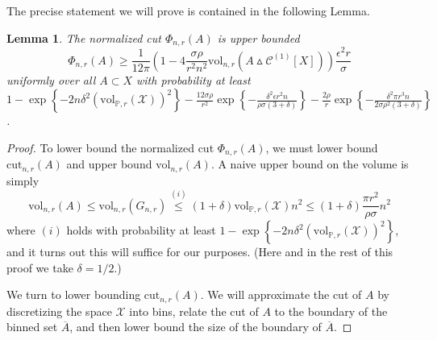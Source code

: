 \documentclass[11pt,twoside]{article}
\newtheorem{lemma}{Lemma}
\theoremstyle{definition}
\newcommand{\set}[1]{\left\{#1\right\}}
\newcommand{\vol}{\mathrm{vol}}
\newcommand{\cut}{\mathrm{cut}}
\newcommand{\1}{\mathbbm{1}}
\newcommand{\Xbf}{X}
\newcommand{\Pbb}{\mathbb{P}}
\newcommand{\Cset}{\mathcal{C}}
\begin{document}
The precise statement we will prove is contained in the following Lemma.
\begin{lemma}
	\label{lem:normalized_cut_lb}
	The normalized cut $\Phi_{n,r}(A)$ is upper bounded
	\begin{equation*}
	\Phi_{n,r}(A) \geq \frac{1}{12\pi} \left(1 - 4\frac{\sigma \rho}{r^2 n^2} \vol_{n,r}(A \vartriangle \Cset^{(1)}[\Xbf]) \right) \frac{\epsilon^2 r}{\sigma}
	\end{equation*}
	uniformly over all $A \subset X$ with probability at least $1 - \exp\set{-2n\delta^2(\vol_{\Pbb,r}(\mathcal{X}))^2} - \frac{12\sigma \rho}{r^2} \exp\set{-\frac{\delta^2\epsilon r^2 n}{\rho \sigma(3 + \delta)}} - \frac{2\rho}{r}\exp\set{-\frac{\delta^2\pi r^3n}{2\sigma\rho^2(3 + \delta)}}$.
\end{lemma}
\begin{proof}
	To lower bound the normalized cut $\Phi_{n,r}(A)$, we must lower bound $\cut_{n,r}(A)$ and upper bound $\vol_{n,r}(A)$. A naive upper bound on the volume is simply 
	\begin{equation}
	\label{eqn:normalized_cut_lb_pf4}
	\vol_{n,r}(A) \leq \vol_{n,r}(G_{n,r}) \overset{(i)}{\leq} (1 + \delta)  \vol_{\Pbb,r}(\mathcal{X}) n^2 \leq (1 + \delta)\frac{\pi r^2}{\rho \sigma} n^2
	\end{equation}
	where $(i)$ holds with probability at least $1 - \exp\set{-2n\delta^2(\vol_{\Pbb,r}(\mathcal{X}))^2}$, and it turns out this will suffice for our purposes. (Here and in the rest of this proof we take $\delta = 1/2$.)
	
	We turn to lower bounding $\cut_{n,r}(A)$. We will approximate the cut of $A$ by discretizing the space $\mathcal{X}$ into bins, relate the cut of $A$ to the boundary of the binned set $\overline{A}$, and then lower bound the size of the boundary of $\overline{A}$.
	

\end{proof}
\end{document}
